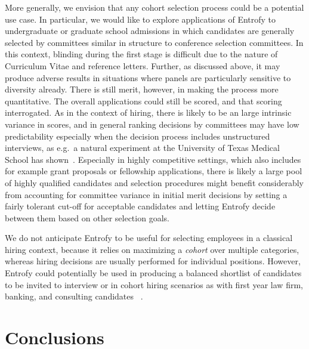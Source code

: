 \documentclass[10pt,letterpaper]{article}
\begin{document}
More generally, we envision that any cohort selection process could be a potential use case.
In particular, we would like to explore applications of Entrofy to undergraduate or graduate school admissions in which candidates are generally selected by committees similar in structure to conference selection committees.
In this context, blinding during the first stage is difficult due to the nature of Curriculum Vitae and reference letters. Further, as discussed above, it may produce adverse results in situations where panels are particularly sensitive to diversity already.
There is still merit, however, in making the process more quantitative.
The overall applications could still be scored, and that scoring interrogated.
As in the context of hiring, there is likely to be an large intrinsic variance in scores, and in general ranking decisions by committees may have low predictability especially when the decision process includes unstructured interviews, as e.g.\ a natural experiment at the University of Texas Medical School has shown~\cite{devaul1987medical}.
Especially in highly competitive settings, which also includes for example grant proposals or fellowship applications, there is likely a large pool of highly qualified candidates and selection procedures might benefit considerably from accounting for committee variance in initial merit decisions by setting a fairly tolerant cut-off for acceptable candidates and letting Entrofy decide between them based on other selection goals.

We do not anticipate Entrofy to be useful for selecting employees in a classical hiring context, because it relies on maximizing a \textit{cohort} over multiple categories, whereas hiring decisions are usually performed for individual positions.
However, Entrofy could potentially be used in producing a balanced shortlist of candidates to be invited to interview or in cohort hiring scenarios as with first year law firm, banking, and consulting candidates ~\cite{rivera2015}.

\section*{Conclusions}
\end{document}
